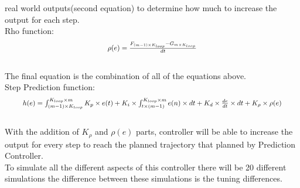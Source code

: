 \documentclass[9pt]{article}
\begin{document}
\begin{multicols}{2}
real world outputs(second equation) to determine how much to increase the output for each step.\\[0.4mm]
Rho function:\\[0.4mm]
\begin{equation}
    \scalebox{0.85}{$\rho(e) = \frac{F_{(m-1) \times K_{loop}} - G_{m\times K_{loop}}}{dt}$}
\end{equation}\\[0.4mm]
The final equation is the combination of all of the equations above.\\[0.4mm]
Step Prediction function:\\[0.4mm]
\begin{equation}
 \scalebox{0.85}{$h(e) = \int_{(m-1)\times K_{loop}}^{K_{loop}\times m} K_p\times e(t) + K_i\times \int_{t\times(m-1)}^{K_{loop}\times m} e(n)\times dt + K_d \times \frac{de}{dt}\times dt + K_{\rho} \times \rho(e)$}
\end{equation}\\[0.4mm]
With the addition of $K_{\rho}$ and $\rho(e)$ parts, controller will be able to increase the output for every step to reach the planned trajectory that planned by Prediction Controller.\\[0.4mm]
To simulate all the different aspects of this controller there will be 20 different simulations the difference between these simulations is the tuning differences.\\[0.4mm]
\end{multicols}
\end{document}
